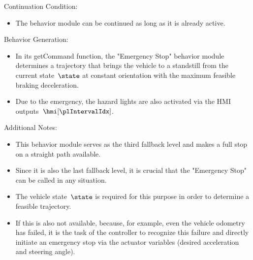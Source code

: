     Continuation Condition:

\begin{itemize}
    \item The behavior module can be continued as long as it is already active.
\end{itemize}

    Behavior Generation:

\begin{itemize}
    \item In its getCommand function, the "Emergency Stop" behavior module determines a trajectory that brings the vehicle to a standstill from the current state~$\state$ at constant orientation with the maximum feasible braking deceleration.
    \item Due to the emergency, the hazard lights are also activated via the HMI outputs~$\hmi[\plIntervalIdx]$.
\end{itemize}

Additional Notes:

\begin{itemize}
    \item This behavior module serves as the third fallback level and makes a full stop on a straight path available.
    \item Since it is also the last fallback level, it is crucial that the "Emergency Stop" can be called in any situation.
    \item The vehicle state~$\state$ is required for this purpose in order to determine a feasible trajectory.
    \item If this is also not available, because, for example, even the vehicle odometry has failed, it is the task of the controller to recognize this failure and directly initiate an emergency stop via the actuator variables (desired acceleration and steering angle).
\end{itemize}

